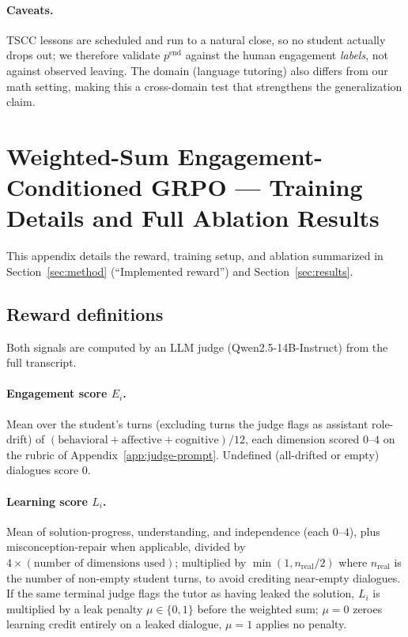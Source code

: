 \documentclass[11pt]{article}
\begin{document}
\paragraph{Caveats.} TSCC lessons are scheduled and run to a natural close, so no
student actually drops out; we therefore validate $p^{\text{end}}$ against the
human engagement \emph{labels}, not against observed leaving. The domain (language
tutoring) also differs from our math setting, making this a cross-domain test that strengthens the generalization claim.

\section{Weighted-Sum Engagement-Conditioned GRPO --- Training Details and Full Ablation Results}
\label{app:grpo-ablation}

This appendix details the reward, training setup, and ablation summarized in
Section~\ref{sec:method} (``Implemented reward'') and
Section~\ref{sec:results}.

\subsection{Reward definitions}
\label{app:grpo-reward-defs}

Both signals are computed by an LLM judge (Qwen2.5-14B-Instruct) from the full
transcript.

\paragraph{Engagement score $E_i$.} Mean over the student's turns (excluding
turns the judge flags as assistant role-drift) of $(\text{behavioral} +
\text{affective} + \text{cognitive})/12$, each dimension scored $0$--$4$ on the
rubric of Appendix~\ref{app:judge-prompt}. Undefined (all-drifted or empty)
dialogues score $0$.

\paragraph{Learning score $L_i$.} Mean of solution-progress, understanding,
and independence (each $0$--$4$), plus misconception-repair when applicable,
divided by $4 \times(\text{number of dimensions used})$; multiplied by
$\min(1, n_{\text{real}}/2)$ where $n_{\text{real}}$ is the number of
non-empty student turns, to avoid crediting near-empty dialogues. If the same
terminal judge flags the tutor as having leaked the solution, $L_i$ is
multiplied by a leak penalty $\mu \in \{0, 1\}$ before the weighted sum;
$\mu{=}0$ zeroes learning credit entirely on a leaked dialogue, $\mu{=}1$
applies no penalty.
\end{document}
